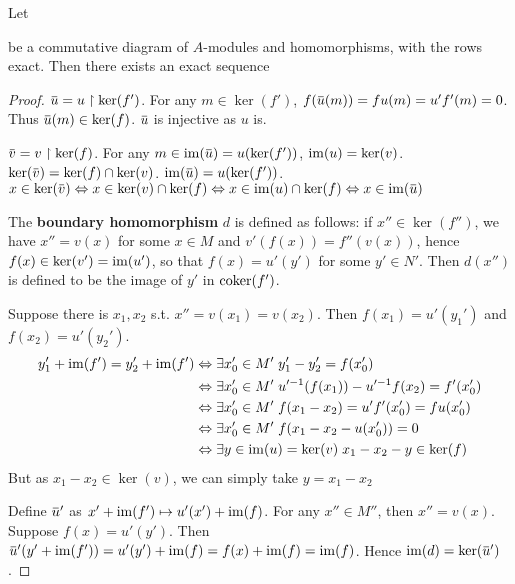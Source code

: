 \documentclass[11pt]{article}
\begin{document}
\begin{proposition}[]
Let
\begin{center}\end{center}
be a commutative diagram of \(A\)-modules and homomorphisms, with the rows exact. Then there
exists an exact sequence
\begin{center}\end{center}
\end{proposition}

\begin{proof}
\(\baru=u\upharpoonright\ker(f')\). For any \(m\in\ker(f')\), \(f(\baru(m))=fu(m)=u'f'(m)=0\). Thus \(\baru(m)\in\ker(f)\). \(\baru\) is injective as \(u\) is.

\(\barv=v\upharpoonright\ker(f)\). For
any
\(m\in\im(\baru)=u(\ker(f'))\),
\(\operatorname{im}(u)=\ker(v)\). \(\ker(\barv)=\ker(f)\cap\ker(v)\). \(\im(\baru)=u(\ker(f'))\).
\(x\in\ker(\barv)\Leftrightarrow x\in\ker(v)\cap\ker(f)\Leftrightarrow x\in\im(u)\cap\ker(f)\Leftrightarrow x\in\im(\baru)\)

The \textbf{boundary homomorphism} \(d\) is defined as follows: if \(x''\in\ker(f'')\), we
have \(x''=v(x)\) for some \(x\in M\) and \(v'(f(x))=f''(v(x))\),
hence \(f(x)\in\ker(v') =\operatorname{im}(u')\), so that \(f(x)=u'(y')\) for some \(y'\in N'\).  Then \(d(x'')\)
is defined to be the image of \(y'\) in \(\operatorname{coker}(f')\).

Suppose there is \(x_1,x_2\) s.t. \(x''=v(x_1)=v(x_2)\). Then \(f(x_1)=u'(y_1')\)
and \(f(x_2)=u'(y_2')\).
\begin{align*}
y_1'+\operatorname{im}(f')=y_2' +\operatorname{im}(f')&\Leftrightarrow\exists x_0'\in M'\; y_1'-y_2'=f(x_0')\\&\Leftrightarrow\exists x_0'\in M'\; u'^{-1}(f(x_1))-u'^{-1}f(x_2)=f'(x_0')
\\&\Leftrightarrow\exists x_0'\in M'\; f(x_1-x_2)=u'f'(x_0')=fu(x_0')\\&\Leftrightarrow\exists x_0'\in M'\; f(x_1-x_2-u(x_0'))=0
\\&\Leftrightarrow\exists y\in\operatorname{im}(u)=\ker(v)\;x_1-x_2-y\in\ker(f)
\end{align*}
But as \(x_1-x_2\in\ker(v)\), we can simply take \(y=x_1-x_2\)

Define \(\baru'\) as \(x'+\operatorname{im}(f')\mapsto u'(x')+ \operatorname{im}(f)\). For any \(x''\in M''\), then \(x''=v(x)\).
Suppose \(f(x)=u'(y')\). Then \(\baru'(y'+\im(f'))=u'(y')+\im(f)=f(x)+\im(f) =\im(f)\).
Hence \(\im(d) =\ker(\baru')\).
\end{proof}
\end{document}
